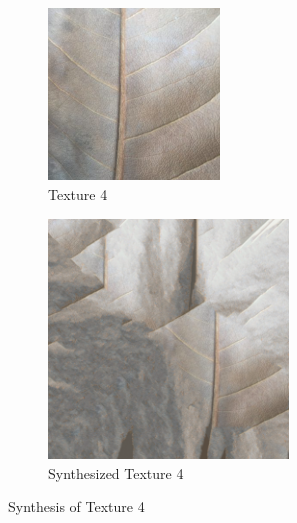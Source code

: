 \documentclass{article}
\begin{document}
\begin{figure}[H]
    \centering
    \begin{subfigure}[b]{0.49\textwidth}
        \centering
        \includegraphics[width=0.5\textwidth]{../Code/Textures/4.png}
        \caption{Texture 4}
        \label{fig:original-4}
    \end{subfigure}
    \hfill %
    \begin{subfigure}[b]{0.49\textwidth}
        \centering
        \includegraphics[width=0.7\textwidth]{../Result/4.png}
        \caption{Synthesized Texture 4}
        \label{fig:synthesized-4}
    \end{subfigure}
    \caption{Synthesis of Texture 4}
    \label{fig:synthesis-4}
\end{figure}
\end{document}
